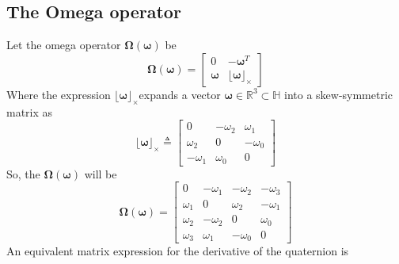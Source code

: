 \subsection{The Omega operator}
Let the omega operator $\boldsymbol{\Omega}(\boldsymbol{\omega})$ be
\begin{equation}
    \boldsymbol{\Omega}(\boldsymbol{\omega})=\left[\begin{array}{cc}
    0 & -\boldsymbol{\omega}^{T} \\
    \boldsymbol{\omega} & \lfloor\boldsymbol{\omega}\rfloor_{\times}
    \end{array}\right]  
\end{equation}
Where the expression $\lfloor\boldsymbol{\omega}\rfloor_{\times}$expands a vector $\boldsymbol{\omega} \in \mathbb{R}^{3} \subset \mathbb{H}$ into a skew-symmetric matrix as
\begin{equation}
    \lfloor\boldsymbol{\omega}\rfloor_{\times} \triangleq\left[\begin{array}{ccc}
    0 & -\omega_{2} & \omega_{1} \\
    \omega_{2} & 0 & -\omega_{0} \\
    -\omega_{1} & \omega_{0} & 0
    \end{array}\right]
\end{equation}
So, the $\boldsymbol{\Omega}(\boldsymbol{\omega})$ will be
\begin{equation}
    \boldsymbol{\Omega}(\boldsymbol{\omega})=\left[\begin{array}{cccc}
    0 & -\omega_{1} & -\omega_{2} & -\omega_{3} \\
    \omega_{1} & 0 & \omega_{2} & -\omega_{1} \\
    \omega_{2} & -\omega_{2} & 0 & \omega_{0} \\
    \omega_{3} & \omega_{1} & -\omega_{0} & 0
    \end{array}\right]
\end{equation}
An equivalent matrix expression for the derivative of the quaternion is

